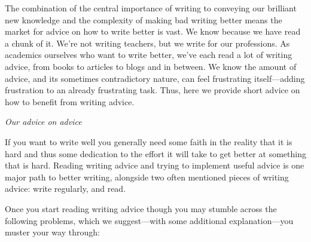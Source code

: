 \documentclass[11pt,letter]{article}
\begin{document}
The combination of the central importance of writing to conveying our brilliant new knowledge and the complexity of making bad writing better means the market for advice on how to write better is vast. We know because we have read a chunk of it. We’re not writing teachers, but we write for our professions. As academics ourselves who want to write better, we've each read a lot of writing advice, from books to articles to blogs and in between. We know the amount of advice, and its sometimes contradictory nature, can feel frustrating itself---adding frustration to an already frustrating task. Thus, here we provide short advice on how to benefit from writing advice. 

\emph{Our advice on advice}

If you want to write well you generally need some faith in the reality that it is hard and thus some dedication to the effort it will take to get better at something that is hard. Reading writing advice and trying to implement useful advice is one major path to better writing, alongside two often mentioned pieces of writing advice: write regularly, and read. 

Once you start reading writing advice though you may stumble across the following problems, which we suggest---with some additional explanation---you muster your way through:
\end{document}

